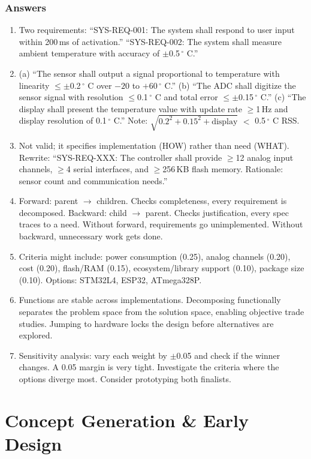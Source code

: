 \documentclass[11pt,letterpaper,twoside,openany]{book}
\begin{document}
\subsection{Answers}
\begin{enumerate}[leftmargin=1.5em]
\item Two requirements: ``SYS-REQ-001: The system shall respond to user input within 200\,ms of activation.'' ``SYS-REQ-002: The system shall measure ambient temperature with accuracy of $\pm$0.5\,$^{\circ}$ C.''
\item (a) ``The sensor shall output a signal proportional to temperature with linearity $\leq \pm$0.2\,$^{\circ}$ C over $-20$ to $+60$\,$^{\circ}$ C.'' (b) ``The ADC shall digitize the sensor signal with resolution $\leq$0.1\,$^{\circ}$ C and total error $\leq \pm$0.15\,$^{\circ}$ C.'' (c) ``The display shall present the temperature value with update rate $\geq$1\,Hz and display resolution of 0.1\,$^{\circ}$ C.'' Note: $\sqrt{0.2^2+0.15^2+\text{display}}$ $<$ 0.5\,$^{\circ}$ C RSS.
\item Not valid; it specifies implementation (HOW) rather than need (WHAT). Rewrite: ``SYS-REQ-XXX: The controller shall provide $\geq$12 analog input channels, $\geq$4 serial interfaces, and $\geq$256\,KB flash memory. Rationale: sensor count and communication needs.''
\item Forward: parent $\to$ children. Checks completeness, every requirement is decomposed. Backward: child $\to$ parent. Checks justification, every spec traces to a need. Without forward, requirements go unimplemented. Without backward, unnecessary work gets done.
\item Criteria might include: power consumption (0.25), analog channels (0.20), cost (0.20), flash/RAM (0.15), ecosystem/library support (0.10), package size (0.10). Options: STM32L4, ESP32, ATmega328P.
\item Functions are stable across implementations. Decomposing functionally separates the problem space from the solution space, enabling objective trade studies. Jumping to hardware locks the design before alternatives are explored.
\item Sensitivity analysis: vary each weight by $\pm$0.05 and check if the winner changes. A 0.05 margin is very tight. Investigate the criteria where the options diverge most. Consider prototyping both finalists.
\end{enumerate}

\chapter{Concept Generation \& Early Design}
\end{document}
